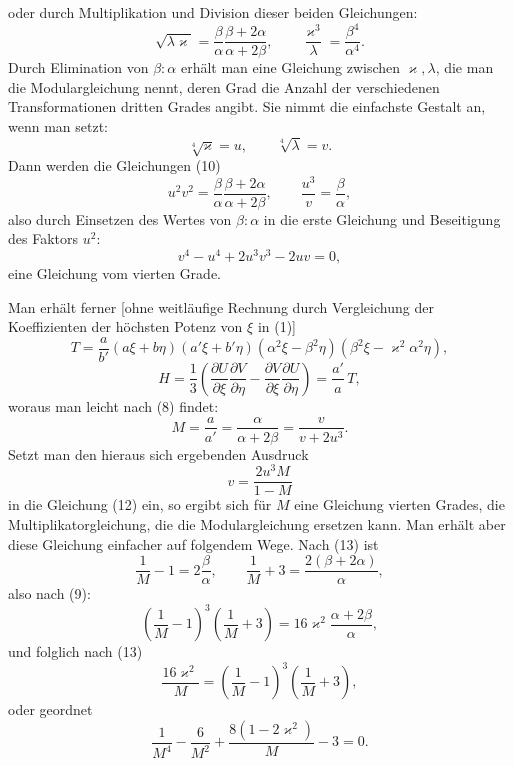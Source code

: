 \documentclass[11pt]{article}
\begin{document}
oder durch Multiplikation und Division dieser beiden Gleichungen:
\begin{equation}
\sqrt{\lambda\varkappa}=\frac{\beta}{\alpha}\frac{\beta+2\alpha}{\alpha+2\beta},
\qquad
\frac{\varkappa^3}{\lambda}=\frac{\beta^4}{\alpha^4}.
\tag{10}
\end{equation}
Durch Elimination von $\beta:\alpha$ erhält man eine Gleichung zwischen $\varkappa,\lambda$, die man die Modulargleichung nennt, deren Grad die Anzahl der verschiedenen Transformationen dritten Grades angibt. Sie nimmt die einfachste Gestalt an, wenn man setzt:
\begin{equation}
\sqrt[4]{\varkappa}=u,\qquad \sqrt[4]{\lambda}=v.
\tag{11}
\end{equation}
Dann werden die Gleichungen (10)
\[
u^2v^2=\frac{\beta}{\alpha}\frac{\beta+2\alpha}{\alpha+2\beta},
\qquad
\frac{u^3}{v}=\frac{\beta}{\alpha},
\]
also durch Einsetzen des Wertes von $\beta:\alpha$ in die erste Gleichung und Beseitigung des Faktors $u^2$:
\begin{equation}
v^4-u^4+2u^3v^3-2uv=0,
\tag{12}
\end{equation}
eine Gleichung vom vierten Grade.

Man erhält ferner [ohne weitläufige Rechnung durch Vergleichung der Koeffizienten der höchsten Potenz von $\xi$ in (1)]
\[
T=\frac{a}{b'}(a\xi+b\eta)(a'\xi+b'\eta)(\alpha^2\xi-\beta^2\eta)(\beta^2\xi-\varkappa^2\alpha^2\eta),
\]
\[
H=\frac13\left(
\frac{\partial U}{\partial\xi}\frac{\partial V}{\partial\eta}
-\frac{\partial V}{\partial\xi}\frac{\partial U}{\partial\eta}
\right)=\frac{a'}a\,T,
\]
woraus man leicht nach (8) findet:
\begin{equation}
M=\frac{a}{a'}=\frac{\alpha}{\alpha+2\beta}
=\frac{v}{v+2u^3}.
\tag{13}
\end{equation}
Setzt man den hieraus sich ergebenden Ausdruck
\[
v=\frac{2u^3M}{1-M}
\]
in die Gleichung (12) ein, so ergibt sich für $M$ eine Gleichung vierten Grades, die Multiplikatorgleichung, die die Modulargleichung ersetzen kann. Man erhält aber diese Gleichung einfacher auf folgendem Wege. Nach (13) ist
\[
\frac1M-1=2\frac{\beta}{\alpha},\qquad
\frac1M+3=\frac{2(\beta+2\alpha)}{\alpha},
\]
also nach (9):
\[
\left(\frac1M-1\right)^3\left(\frac1M+3\right)
=16\varkappa^2\frac{\alpha+2\beta}{\alpha},
\]
und folglich nach (13)
\[
\frac{16\varkappa^2}{M}
=\left(\frac1M-1\right)^3\left(\frac1M+3\right),
\]
oder geordnet
\begin{equation}
\frac1{M^4}-\frac6{M^2}+\frac{8(1-2\varkappa^2)}{M}-3=0.
\tag{14}
\end{equation}
\end{document}
